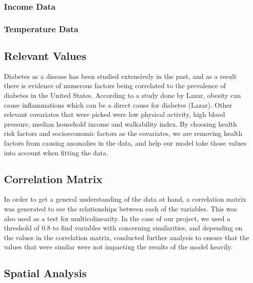 \documentclass[
]{article}
\begin{document}
\subsubsection{Income Data}\label{income-data}

\subsubsection{Temperature Data}\label{temperature-data}

\subsection{Relevant Values}\label{relevant-values}

Diabetes as a disease has been studied extensively in the past, and as a
result there is evidence of numerous factors being correlated to the
prevalence of diabetes in the United States. According to a study done
by Lazar, obesity can cause inflammations which can be a direct cause
for diabetes (Lazar). Other relevant covariates that were picked were
low physical activity, high blood pressure, median household income and
walkability index. By choosing health risk factors and socioeconomic
factors as the covariates, we are removing health factors from causing
anomalies in the data, and help our model take those values into account
when fitting the data.

\subsection{Correlation Matrix}\label{correlation-matrix}

In order to get a general understanding of the data at hand, a
correlation matrix was generated to see the relationships between each
of the variables. This was also used as a test for multicolinearity. In
the case of our project, we used a threshold of 0.8 to find variables
with concerning similarities, and depending on the values in the
correlation matrix, conducted further analysis to ensure that the values
that were similar were not impacting the results of the model heavily.

\subsection{Spatial Analysis}\label{spatial-analysis}
\end{document}
